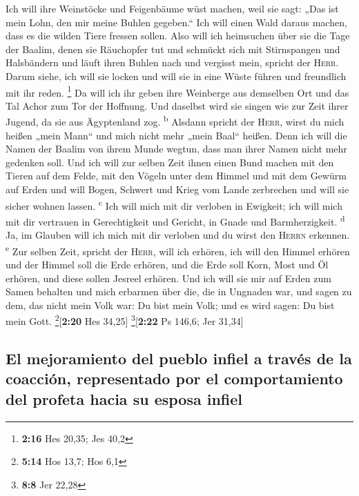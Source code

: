  Ich will ihre Weinstöcke und Feigenbäume wüst machen,
weil sie sagt: „Das ist mein Lohn, den mir meine Buhlen gegeben.`` Ich
will einen Wald daraus machen, dass es die wilden Tiere fressen sollen.
 Also will ich heimsuchen über sie die Tage der Baalim,
denen sie Räuchopfer tut und schmückt sich mit Stirnspangen und
Halsbändern und läuft ihren Buhlen nach und vergisst mein, spricht der
\textsc{Herr}.  Darum siehe, ich will sie locken und will
sie in eine Wüste führen und freundlich mit ihr reden. \footnote{\textbf{2:16}
  Hes 20,35; Jes 40,2}  Da will ich ihr geben ihre
Weinberge aus demselben Ort und das Tal Achor zum Tor der Hoffnung. Und
daselbst wird sie singen wie zur Zeit ihrer Jugend, da sie aus
Ägyptenland zog. \textsuperscript{b}  Alsdann spricht der
\textsc{Herr}, wirst du mich heißen „mein Mann`` und mich nicht mehr
„mein Baal`` heißen.  Denn ich will die Namen der Baalim
von ihrem Munde wegtun, dass man ihrer Namen nicht mehr gedenken soll.
 Und ich will zur selben Zeit ihnen einen Bund machen mit
den Tieren auf dem Felde, mit den Vögeln unter dem Himmel und mit dem
Gewürm auf Erden und will Bogen, Schwert und Krieg vom Lande zerbrechen
und will sie sicher wohnen lassen. \textsuperscript{c} 
Ich will mich mit dir verloben in Ewigkeit; ich will mich mit dir
vertrauen in Gerechtigkeit und Gericht, in Gnade und Barmherzigkeit.
\textsuperscript{d}  Ja, im Glauben will ich mich mit dir
verloben und du wirst den \textsc{Herrn} erkennen. \textsuperscript{e}
 Zur selben Zeit, spricht der \textsc{Herr}, will ich
erhören, ich will den Himmel erhören und der Himmel soll die Erde
erhören,  und die Erde soll Korn, Most und Öl erhören,
und diese sollen Jesreel erhören.  Und ich will sie mir
auf Erden zum Samen behalten und mich erbarmen über die, die in Ungnaden
war, und sagen zu dem, das nicht mein Volk war: Du bist mein Volk; und
es wird sagen: Du bist mein Gott. \footnote{\textbf{5:14} Hos 13,7; Hos
  6,1}{[}\textbf{2:20} Hes 34,25{]} \footnote{\textbf{8:8} Jer 22,28}{[}\textbf{2:22}
Ps 146,6; Jer 31,34{]}

\hypertarget{el-mejoramiento-del-pueblo-infiel-a-travuxe9s-de-la-coacciuxf3n-representado-por-el-comportamiento-del-profeta-hacia-su-esposa-infiel}{%
\subsection{El mejoramiento del pueblo infiel a través de la coacción,
representado por el comportamiento del profeta hacia su esposa
infiel}\label{el-mejoramiento-del-pueblo-infiel-a-travuxe9s-de-la-coacciuxf3n-representado-por-el-comportamiento-del-profeta-hacia-su-esposa-infiel}}

